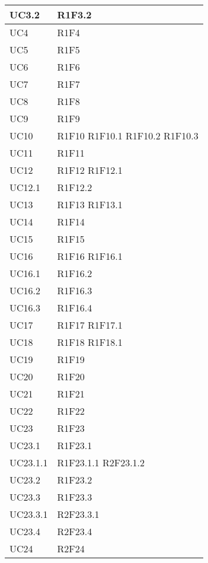 \begin{center}
\begin{longtable}{|p{44mm}|p{22mm}|}
\hline
UC3.2 &
R1F3.2 
\\
\hline
UC4 &
R1F4 
\\
\hline
UC5 &
R1F5 
\\
\hline
UC6 &
R1F6 
\\
\hline
UC7 &
R1F7 
\\
\hline
UC8 &
R1F8 
\\
\hline
UC9 &
R1F9 
\\
\hline
UC10 &
R1F10 \newline
R1F10.1 \newline
R1F10.2 \newline
R1F10.3 
\\
\hline
UC11 &
R1F11 
\\
\hline
UC12 &
R1F12 \newline
R1F12.1 
\\
\hline
UC12.1 &
R1F12.2 
\\
\hline
UC13 &
R1F13 \newline
R1F13.1 
\\
\hline
UC14 &
R1F14 
\\
\hline
UC15 &
R1F15 
\\
\hline
UC16 &
R1F16 \newline
R1F16.1 
\\
\hline
UC16.1 &
R1F16.2 
\\
\hline
UC16.2 &
R1F16.3 
\\
\hline
UC16.3 &
R1F16.4 
\\
\hline
UC17 &
R1F17 \newline
R1F17.1 
\\
\hline
UC18 &
R1F18 \newline
R1F18.1 
\\
\hline
UC19 &
R1F19 
\\
\hline
UC20 &
R1F20 
\\
\hline
UC21 &
R1F21 
\\
\hline
UC22 &
R1F22 
\\
\hline
UC23 &
R1F23 
\\
\hline
UC23.1 &
R1F23.1 
\\
\hline
UC23.1.1 &
R1F23.1.1 \newline
R2F23.1.2 
\\
\hline
UC23.2 &
R1F23.2 
\\
\hline
UC23.3 &
R1F23.3 
\\
\hline
UC23.3.1 &
R2F23.3.1 
\\
\hline
UC23.4 &
R2F23.4 
\\
\hline
UC24 &
R2F24 
\\

\end{longtable}
\end{center}
